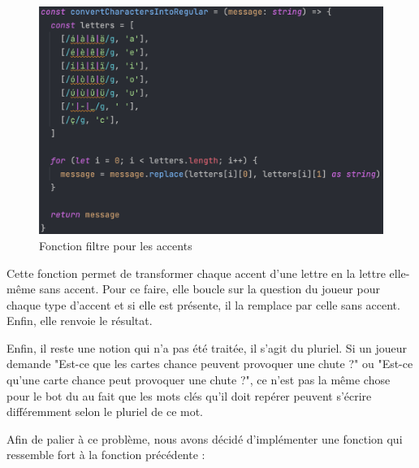 \documentclass[a4paper, 11pt]{article}
\begin{document}
\begin{figure}[!h]
	\centering
	\includegraphics[scale=.6]{assets/fonction-accent.png}
	\caption{Fonction filtre pour les accents}
\end{figure}

\newpage

Cette fonction permet de transformer chaque accent d'une lettre en la lettre elle-même sans accent. Pour ce faire, elle boucle sur la question du joueur pour chaque type d'accent et si elle est présente, il la remplace par celle sans accent. Enfin, elle renvoie le résultat.\newline

Enfin, il reste une notion qui n'a pas été traitée, il s'agit du pluriel. Si un joueur demande "Est-ce que les cartes chance peuvent provoquer une chute ?" ou "Est-ce qu'une carte chance peut provoquer une chute ?", ce n'est pas la même chose pour le bot du au fait que les mots clés qu'il doit repérer peuvent s'écrire différemment selon le pluriel de ce mot.\newline

Afin de palier à ce problème, nous avons décidé d'implémenter une fonction qui ressemble fort à la fonction précédente : 
\end{document}
